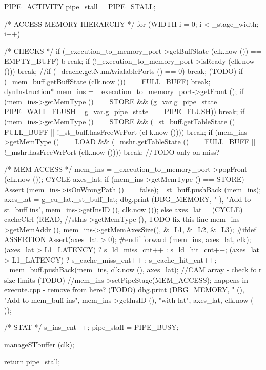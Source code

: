\begin{DoxyCode}
                                               {
    PIPE_ACTIVITY pipe_stall = PIPE_STALL;

    /* ACCESS MEMORY HIERARCHY */
    for (WIDTH i = 0; i < _stage_width; i++) {
        /* CHECKS */
        if (_execution_to_memory_port->getBuffState (clk.now ()) == EMPTY_BUFF) b
      reak;
        if (!_execution_to_memory_port->isReady (clk.now ())) break;
        //if (_dcache.getNumAvialablePorts () == 0) break; (TODO)
        if (_mem_buff.getBuffState (clk.now ()) == FULL_BUFF) break;
        dynInstruction* mem_ins = _execution_to_memory_port->getFront ();
        if (mem_ins->getMemType () == STORE && 
           (g_var.g_pipe_state == PIPE_WAIT_FLUSH || g_var.g_pipe_state == 
      PIPE_FLUSH)) break;
        if (mem_ins->getMemType () == STORE && 
           (_st_buff.getTableState () == FULL_BUFF || !_st_buff.hasFreeWrPort (cl
      k.now ()))) break;
        if (mem_ins->getMemType () == LOAD &&
           (_mshr.getTableState () == FULL_BUFF || !_mshr.hasFreeWrPort (clk.now 
      ()))) break; //TODO only on miss?

        /* MEM ACCESS */
        mem_ins = _execution_to_memory_port->popFront (clk.now ());
        CYCLE axes_lat;
        if (mem_ins->getMemType () == STORE) {
            Assert (mem_ins->isOnWrongPath () == false);
            _st_buff.pushBack (mem_ins);
            axes_lat = g_eu_lat._st_buff_lat;
            dbg.print (DBG_MEMORY, "%
      ), "Add to st_buff ins", mem_ins->getInsID (), clk.now ());
        } else {
            axes_lat = (CYCLE) cacheCtrl (READ,  //stIns->getMemType (), TODO fix
       this line
                                           mem_ins->getMemAddr (),
                                           mem_ins->getMemAxesSize(),
                                           &_L1, &_L2, &_L3);
#ifdef ASSERTION
            Assert(axes_lat > 0);
#endif
            forward (mem_ins, axes_lat, clk);
            (axes_lat > L1_LATENCY) ? s_ld_miss_cnt++ : s_ld_hit_cnt++;
            (axes_lat > L1_LATENCY) ? s_cache_miss_cnt++ : s_cache_hit_cnt++;
        }
        _mem_buff.pushBack(mem_ins, clk.now (), axes_lat); //CAM array - check fo
      r size limits (TODO)
        //mem_ins->setPipeStage(MEM_ACCESS); happens in execute.cpp - remove from
       here? (TODO)
        dbg.print (DBG_MEMORY, "%
       (), "Add to mem_buff ins", mem_ins->getInsID (), "with lat", axes_lat, clk.now (
      ));

        /* STAT */
        s_ins_cnt++;
        pipe_stall = PIPE_BUSY;
    }

    manageSTbuffer (clk);

    return pipe_stall;
}
\end{DoxyCode}
